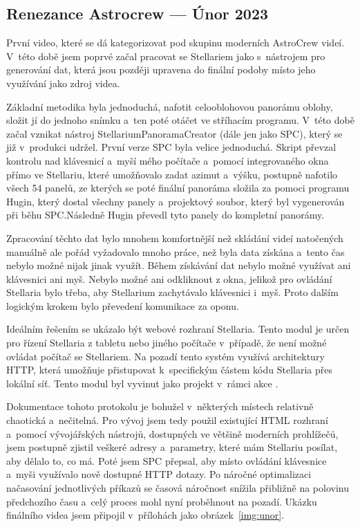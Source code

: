 \documentclass[12pt,a4paper,titlepage]{article}
\begin{document}
\subsection{Renezance Astrocrew --- Únor 2023}
První video, které se dá kategorizovat pod skupinu moderních AstroCrew videí. V~této době jsem poprvé začal pracovat se Stellariem jako s~nástrojem pro generování dat, která jsou později upravena do finální podoby místo jeho využívání jako zdroj videa. 

Základní metodika byla jednoduchá, nafotit celooblohovou panorámu oblohy, složit jí do jednoho snímku a~ten poté otáčet ve stříhacím programu. V~této době začal vznikat nástroj StellariumPanoramaCreator (dále jen jako SPC), který se již v~produkci udržel. První verze SPC byla velice jednoduchá. Skript převzal kontrolu nad klávesnicí a~myší mého počítače a~pomocí integrovaného okna přímo ve Stellariu, které umožňovalo zadat azimut a~výšku, postupně nafotilo všech 54 panelů, ze kterých se poté finální panoráma složila za pomoci programu Hugin, který dostal všechny panely a~projektový soubor, který byl vygenerován při běhu SPC.\@ Následně Hugin převedl tyto panely do kompletní panorámy.

Zpracování těchto dat bylo mnohem komfortnější než skládání videí natočených manuálně ale pořád vyžadovalo mnoho práce, než byla data získána a~tento čas nebylo možné nijak jinak využít. Během získávání dat nebylo možné využívat ani klávesnici ani myš. Nebylo možné ani odkliknout z okna, jelikož pro ovládání Stellaria bylo třeba, aby Stellarium zachytávalo klávesnici i~myš. Proto dalším logickým krokem bylo převedení komunikace za oponu. 

Ideálním řešením se ukázalo být webové rozhraní Stellaria. Tento modul je určen pro řízení Stellaria z tabletu nebo jiného počítače v~případě, že není možné ovládat počítač se Stellariem. Na pozadí tento systém využívá architektury HTTP, která umožňuje přistupovat k~specifickým částem kódu Stellaria přes lokální síť. Tento modul byl vyvinut jako projekt v~rámci akce . 

Dokumentace tohoto protokolu je bohužel v~některých místech relativně chaotická a~nečitelná. Pro vývoj jsem tedy použil existující HTML rozhraní a~pomocí vývojářských nástrojů, dostupných ve většině moderních prohlížečů, jsem postupně zjistil veškeré adresy a~parametry, které mám Stellariu posílat, aby dělalo to, co má. Poté jsem SPC přepsal, aby místo ovládání klávesnice a~myši využívalo nově dostupné HTTP dotazy. Po náročné optimalizaci načasování jednotlivých příkazů se časová náročnost snížila přibližně na polovinu předchozího času a~celý proces mohl nyní proběhnout na pozadí. Ukázku finálního videa jsem připojil v~přílohách jako obrázek~\ref{img:unor}.
\end{document}
